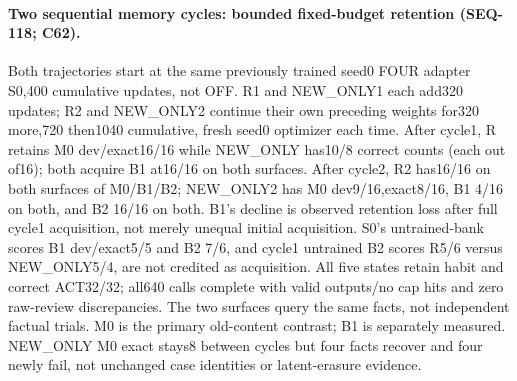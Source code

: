 \documentclass{article}
\begin{document}
\paragraph{Two sequential memory cycles: bounded fixed-budget retention (SEQ-118; C62).} Both trajectories start at the same previously trained seed0 FOUR adapter S0,400 cumulative updates, not OFF. R1 and NEW\_ONLY1 each add320 updates; R2 and NEW\_ONLY2 continue their own preceding weights for320 more,720 then1040 cumulative, fresh seed0 optimizer each time. After cycle1, R retains M0 dev/exact16/16 while NEW\_ONLY has10/8 correct counts (each out of16); both acquire B1 at16/16 on both surfaces. After cycle2, R2 has16/16 on both surfaces of M0/B1/B2; NEW\_ONLY2 has M0 dev9/16,exact8/16, B1 4/16 on both, and B2 16/16 on both. B1's decline is observed retention loss after full cycle1 acquisition, not merely unequal initial acquisition. S0's untrained-bank scores B1 dev/exact5/5 and B2 7/6, and cycle1 untrained B2 scores R5/6 versus NEW\_ONLY5/4, are not credited as acquisition. All five states retain habit and correct ACT32/32; all640 calls complete with valid outputs/no cap hits and zero raw-review discrepancies. The two surfaces query the same facts, not independent factual trials. M0 is the primary old-content contrast; B1 is separately measured. NEW\_ONLY M0 exact stays8 between cycles but four facts recover and four newly fail, not unchanged case identities or latent-erasure evidence.
\end{document}
